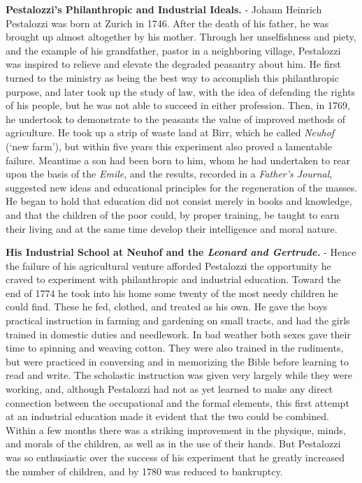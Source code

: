 \documentclass[
]{book}
\begin{document}
\textbf{Pestalozzi's Philanthropic and Industrial Ideals.} - Johann Heinrich Pestalozzi was born at Zurich in 1746. After the death of his father, he was brought up almost altogether by his mother. Through her unselfishness and piety, and the example of his grandfather, pastor in a neighboring village, Pestalozzi was inspired to relieve and elevate the degraded peasantry about him. He first turned to the ministry as being the best way to accomplish this philanthropic purpose, and later took up the study of law, with the idea of defending the rights of his people, but he was not able to succeed in either profession. Then, in 1769, he undertook to demonstrate to the peasants the value of improved methods of agriculture. He took up a strip of waste land at Birr, which he called \emph{Neuhof} (`new farm'), but within five years this experiment also proved a lamentable failure. Meantime a son had been born to him, whom he had undertaken to rear upon the basis of the \emph{Emile}, and the results, recorded in a \emph{Father's Journal}, suggested new ideas and educational principles for the regeneration of the masses. He began to hold that education did not consist merely in books and knowledge, and that the children of the poor could, by proper training, be taught to earn their living and at the same time develop their intelligence and moral nature.

\textbf{His Industrial School at Neuhof and the \emph{Leonard and Gertrude.}} - Hence the failure of his agricultural venture afforded Pestalozzi the opportunity he craved to experiment with philanthropic and industrial education. Toward the end of 1774 he took into his home some twenty of the most needy children he could find. These he fed, clothed, and treated as his own. He gave the boys practical instruction in farming and gardening on small tracts, and had the girls trained in domestic duties and needlework. In bad weather both sexes gave their time to spinning and weaving cotton. They were also trained in the rudiments, but were practiced in conversing and in memorizing the Bible before learning to read and write. The scholastic instruction was given very largely while they were working, and, although Pestalozzi had not as yet learned to make any direct connection between the occupational and the formal elements, this first attempt at an industrial education made it evident that the two could be combined. Within a few months there was a striking improvement in the physique, minds, and morals of the children, as well as in the use of their hands. But Pestalozzi was so enthusiastic over the success of his experiment that he greatly increased the number of children, and by 1780 was reduced to bankruptcy.
\end{document}
